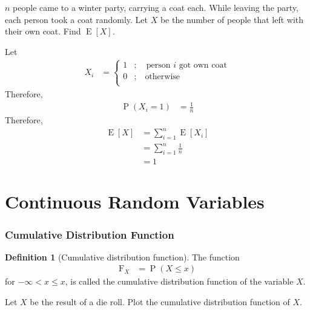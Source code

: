 \documentclass[titlepage, fleqn, a4paper, 12pt, twoside]{article}
\theoremstyle{definition}
\newtheorem{definition}{Definition}
\theoremstyle{theorem}
\DeclareMathOperator{\prob}{\mathrm{P}}
\DeclareMathOperator{\expct}{\mathrm{E}}
\newcommand*{\cdf}[1]{\mathrm{F}_{#1}}
\begin{document}
\begin{question}
	$n$ people came to a winter party, carrying a coat each.
	While leaving the party, each person took a coat randomly.
	Let $X$ be the number of people that left with their own coat.
	Find $\expct[X]$.
\end{question}

\begin{solution}
	Let
	\begin{align*}
		X_i &=
			\begin{cases}
				1 & ;\quad \text{person $i$ got own coat} \\
				0 & ;\quad \text{otherwise}               \\
			\end{cases}
	\end{align*}
	Therefore,
	\begin{align*}
		\prob(X_i = 1) & = \frac{1}{n}
	\end{align*}
	Therefore,
	\begin{align*}
		\expct[X] & = \sum\limits_{i = 1}^{n} \expct[X_i] \\
                          & = \sum\limits_{i = 1}^{n} \frac{1}{n} \\
                          & = 1
	\end{align*}
\end{solution}

\clearpage
\part{Continuous Random Variables}

\section{Cumulative Distribution Function}

\begin{definition}[Cumulative distribution function]
	The function
	\begin{align*}
		\cdf{X} & = \prob(X \le x)
	\end{align*}
	for $-\infty < x \le x$, is called the cumulative distribution function of the variable $X$.
\end{definition}

\begin{question}
	Let $X$ be the result of a die roll.
	Plot the cumulative distribution function of $X$.
\end{question}
\end{document}
